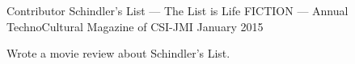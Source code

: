 
\begin{cventries}

  \cventry%
    {Contributor} %
    {Schindler's List --- The List is Life} %
    {FICTION --- Annual TechnoCultural Magazine of CSI-JMI} %
    {January 2015} %
    {%
      \begin{cvitems} %
        \item{Wrote a movie review about Schindler's List.}
      \end{cvitems}
    }

\end{cventries}

